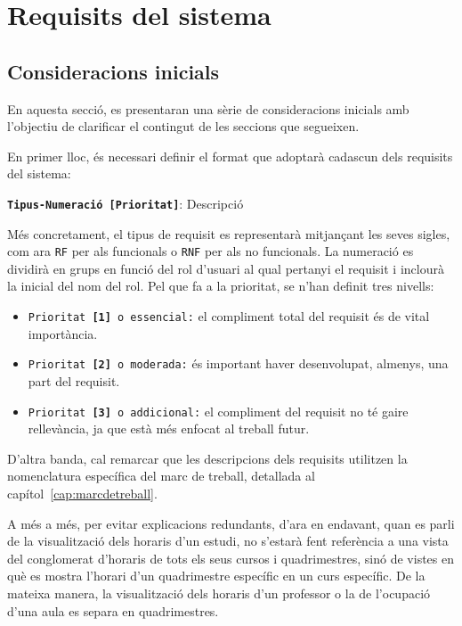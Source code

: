 \documentclass[a4paper,12pt]{ThesisStyle}
\begin{document}
\chapter{Requisits del sistema}
\label{cap:requisits}

\section{Consideracions inicials}
\label{sec:consideracions_inicials}

En aquesta secció, es presentaran una sèrie de consideracions inicials amb l'objectiu de clarificar el contingut de les seccions que segueixen.

En primer lloc, és necessari definir el format que adoptarà cadascun dels requisits del sistema:
\\[8pt]
\centerline{\texttt{\textbf{Tipus-Numeració [Prioritat]}}: Descripció}

Més concretament, el tipus de requisit es representarà mitjançant les seves sigles, com ara \texttt{RF} per als funcionals o \texttt{RNF} per als no funcionals. La numeració es dividirà en grups en funció del rol d'usuari al qual pertanyi el requisit i inclourà la inicial del nom del rol. Pel que fa a la prioritat, se n'han definit tres nivells:
\begin{itemize}
  \item \texttt{Prioritat \textbf{[1]} o essencial:} el compliment total del requisit és de vital importància.
  \item \texttt{Prioritat \textbf{[2]} o moderada:} és important haver desenvolupat, almenys, una part del requisit.
  \item \texttt{Prioritat \textbf{[3]} o addicional:} el compliment del requisit no té gaire rellevància, ja que està més enfocat al treball futur.
\end{itemize}

D'altra banda, cal remarcar que les descripcions dels requisits utilitzen la nomenclatura específica del marc de treball, detallada al capítol~\ref{cap:marcdetreball}.

A més a més, per evitar explicacions redundants, d'ara en endavant, quan es parli de la visualització dels horaris d'un estudi, no s'estarà fent referència a una vista del conglomerat d'horaris de tots els seus cursos i quadrimestres, sinó de vistes en què es mostra l'horari d'un quadrimestre específic en un curs específic. De la mateixa manera, la visualització dels horaris d'un professor o la de l'ocupació d'una aula es separa en quadrimestres.
\end{document}
